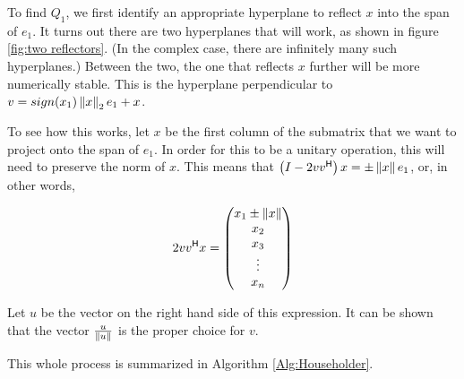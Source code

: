 To find $Q_1$, we first identify an appropriate hyperplane to reflect $x$ into the span of $e_1$.
It turns out there are two hyperplanes that will work, as shown in figure \ref{fig:two reflectors}.
(In the complex case, there are infinitely many such hyperplanes.)
Between the two, the one that reflects $x$ further will be more numerically stable.
This is the hyperplane perpendicular to $v = sign(x_1)\left\lVert x\right\rVert_2 e_1 + x$.

To see how this works, let $x$ be the first column of the submatrix that we want to project onto the span of $e_1$.
In order for this to be a unitary operation, this will need to preserve the norm of $x$.
This means that $\left( I - 2 v v^\mathsf{H} \right) x = \pm \left\lVert x\right\rVert e_1$, or, in other words,

\[ 2 v v^\mathsf{H} x =
\begin{pmatrix}
x_1 \pm \left\lVert x\right\rVert \\
x_2 \\
x_3 \\
\vdots \\
x_n
\end{pmatrix}\]

Let $u$ be the vector on the right hand side of this expression.
It can be shown that the vector  $\frac{u}{\left\lVert u\right\rVert}$ is the proper choice for $v$.
%
%
%
%
%
%

This whole process is summarized in Algorithm \ref{Alg:Householder}.

